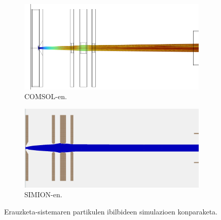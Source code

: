 \documentclass[12pt]{article}
\numberwithin{figure}{section}
\numberwithin{equation}{section}
\begin{document}
\begin{figure}[h]
    \centering
    \begin{subfigure}[b]{0.45\textwidth}
        \centering
        \includegraphics[width=\linewidth]{3 - COMSOL/balidazioak-ibilbideak.png}
        \caption{COMSOL-en.}
        \label{fig:comsol_trajectories_validation}
    \end{subfigure}
    \hspace{0.02\textwidth}
    \begin{subfigure}[b]{0.45\textwidth}
        \centering
        \includegraphics[width=\linewidth]{3 - COMSOL/simion_trajectories.png}
        \caption{SIMION-en.}
        \label{fig:simion_trajectory}
    \end{subfigure}
    \caption{Erauzketa-sistemaren partikulen ibilbideen simulazioen konparaketa.}
    \label{fig:partikula_ibilbideak}
\end{figure}
\end{document}
